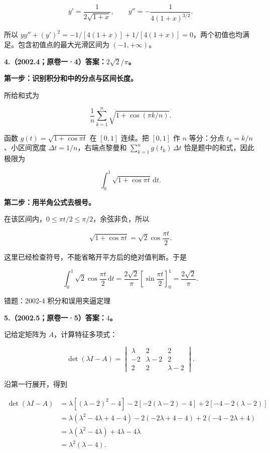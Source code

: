 \documentclass[UTF8,11pt,fontset=windows]{ctexart}
\begin{document}
$$
y'=\frac1{2\sqrt{1+x}},\qquad
 y''=-\frac1{4(1+x)^{3/2}}.
$$

所以 $yy''+(y')^2=-1/[4(1+x)]+1/[4(1+x)]=0$，两个初值也均满足。包含初值点的最大光滑区间为 $(-1,+\infty)$。

\clearpage

\textbf{4.（2002.4；原卷一·4）答案：$2\sqrt2/\pi$。}

\textbf{第一步：识别积分和中的分点与区间长度。}

所给和式为

$$
\frac1n\sum_{k=1}^n\sqrt{1+\cos(\pi k/n)}.
$$

函数 $g(t)=\sqrt{1+\cos\pi t}$ 在 $[0,1]$ 连续。把 $[0,1]$ 作 $n$ 等分：分点 $t_k=k/n$、小区间宽度 $\Delta t=1/n$，右端点黎曼和 $\sum_{k=1}^n g(t_k)\,\Delta t$ 恰是题中的和式，因此极限为

$$
\int_0^1\sqrt{1+\cos\pi t}\,\mathrm dt.
$$

\textbf{第二步：用半角公式去根号。}

在该区间内，$0\le\pi t/2\le\pi/2$，余弦非负，所以

$$
\sqrt{1+\cos\pi t}=\sqrt2\cos\frac{\pi t}{2}.
$$

这里已经检查符号，不能省略开平方后的绝对值判断。于是

$$
\int_0^1\sqrt2\cos\frac{\pi t}{2}\,\mathrm dt
=\frac{2\sqrt2}{\pi}\left[\sin\frac{\pi t}{2}\right]_0^1
=\frac{2\sqrt2}{\pi}.
$$

\begingroup\color{gray}错题：2002-4 积分和误用夹逼定理\par\endgroup

\clearpage

\textbf{5.（2002.5；原卷一·5）答案：$4$。}

记给定矩阵为 $A$，计算特征多项式：

$$
\det(\lambda I-A)
=\begin{vmatrix}\lambda&2&2\\-2&\lambda-2&2\\2&2&\lambda-2\end{vmatrix}.
$$

沿第一行展开，得到

$$
\begin{aligned}
\det(\lambda I-A)
&=\lambda[(\lambda-2)^2-4]
-2[-2(\lambda-2)-4]+2[-4-2(\lambda-2)]\\
&=\lambda(\lambda^2-4\lambda+4-4)
-2(-2\lambda+4-4)+2(-4-2\lambda+4)\\
&=\lambda(\lambda^2-4\lambda)+4\lambda-4\lambda\\
&=\lambda^2(\lambda-4).
\end{aligned}
$$
\end{document}
